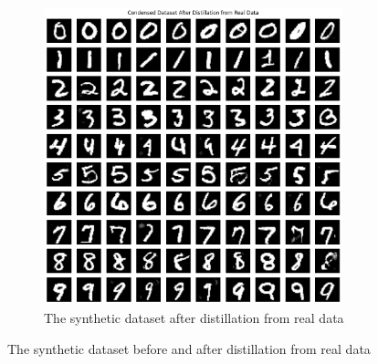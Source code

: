 \documentclass[onecolumn]{IEEEtran}
\begin{document}
\begin{figure}[H]
\begin{subfigure}{.5\textwidth}
        \includegraphics[width=0.95\textwidth]{images/MNIST_datadam_after_distil_real.png}
        \caption{The synthetic dataset after distillation from real data}
        \label{fig:MNIST_datadam_after_distil_real}
    \end{subfigure}
    \caption{The synthetic dataset before and after distillation from real data}
\end{figure}
\end{document}
